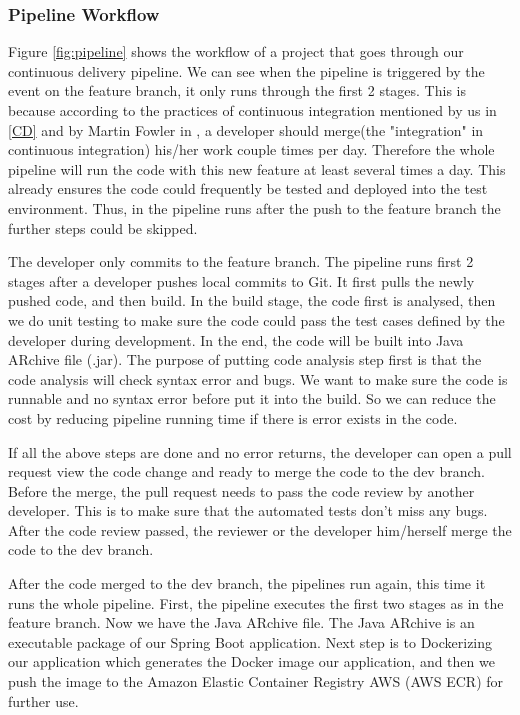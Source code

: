 \subsubsection{Pipeline Workflow}
Figure \ref{fig:pipeline} shows the workflow of a project that goes through our continuous delivery pipeline.
We can see when the pipeline is triggered by the event on the feature branch, it only runs through the first 2 stages. This is because according to the practices of continuous integration mentioned by us in \ref{CD} and by Martin Fowler in \cite{fowler2006continuous}, a developer should merge(the "integration" in continuous integration) his/her work couple times per day. Therefore the whole pipeline will run the code with this new feature at least several times a day. This already ensures the code could frequently be tested and deployed into the test environment. Thus, in the pipeline runs after the push to the feature branch the further steps could be skipped. 
\par
 The developer only commits to the feature branch. The pipeline runs first 2 stages after a developer pushes local commits to Git. It first pulls the newly pushed code, and then build. In the build stage, the code first is analysed, then we do unit testing to make sure the code could pass the test cases defined by the developer during development. In the end, the code will be built into Java ARchive file (.jar). The purpose of putting code analysis step first is that the code analysis will check syntax error and bugs. We want to make sure the code is runnable and no syntax error before put it into the build. So we can reduce the cost by reducing pipeline running time if there is error exists in the code. 
\par
If all the above steps are done and no error returns, the developer can open a pull request view the code change and ready to merge the code to the dev branch. Before the merge, the pull request needs to pass the code review by another developer. This is to make sure that the automated tests don't miss any bugs. After the code review passed, the reviewer or the developer him/herself merge the code to the dev branch.  
\par
After the code merged to the dev branch, the pipelines run again, this time it runs the whole pipeline. First, the pipeline executes the first two stages as in the feature branch. Now we have the Java ARchive file. The Java ARchive is an executable package of our Spring Boot application. Next step is to Dockerizing our application which generates the Docker image our application, and then we push the image to the Amazon Elastic Container Registry AWS (AWS ECR) for further use.
